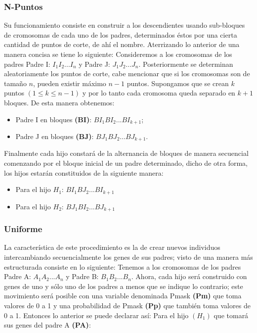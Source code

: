 \documentclass[class=report, crop=false]{standalone}
\begin{document}
\subsubsection{N-Puntos}
Su funcionamiento consiste en construir a los descendientes 
usando sub-bloques de cromosomas de cada uno de los padres, 
determinados éstos por una cierta cantidad de puntos de corte, 
de ahí el nombre. Aterrizando lo anterior de una manera concisa 
se tiene lo siguiente:\medskip\break
Consideremos a los cromosomas de los padres Padre I: 
$I_1I_2...I_n$ y Padre J: $J_1J_2...J_n$.\break
Posteriormente se determinan aleatoriamente los puntos de corte, 
cabe mencionar que si los cromosomas son de tamaño $n$, pueden 
existir máximo $n - 1$ puntos. Supongamos que se crean $k$ puntos 
$(1 \leqslant k \leqslant n - 1)$ y por lo tanto cada cromosoma 
queda separado en $k + 1$ bloques.\break
De esta manera obtenemos:

\begin{itemize}
\item Padre I en bloques \textbf{(BI)}: $BI_1BI_2...BI_{k + 1}$;
\item Padre J en bloques \textbf{(BJ)}: $BJ_1BJ_2...BJ_{k + 1}$.
\end{itemize}

Finalmente cada hijo constará de la alternancia de bloques de 
manera secuencial comenzando por el bloque inicial de un padre 
determinado, dicho de otra forma, los hijos estarán constituidos 
de la siguiente manera:

\begin{itemize}
\item Para el hijo $H_1$: $BI_1BJ_2...BI_{k + 1}$
\item Para el hijo $H_2$: $BJ_1BI_2...BJ_{k + 1}$
\end{itemize}

\subsubsection{Uniforme}
La característica de este procedimiento es la de crear nuevos 
individuos intercambiando secuencialmente los genes de sus 
padres; visto de una manera más estructurada consiste en 
lo siguiente:\medskip\break
Tenemos a los cromosomas de los padres Padre A: $A_1A_2...A_n$ 
y Padre B: $B_1B_2...B_n$.\break
Ahora, cada hijo será construido con genes de uno y sólo uno 
de los padres a menos que se indique lo contrario; este 
movimiento será posible con una variable denominada Pmask 
\textbf{(Pm)} que toma valores de 0 a 1 y una probabilidad 
de Pmask \textbf{(Pp)} que también toma valores de 0 a 1. 
Entonces lo anterior se puede declarar así:\medskip\break
Para el hijo $(H_1)$ que tomará sus genes del padre A \textbf{(PA)}:
\end{document}
